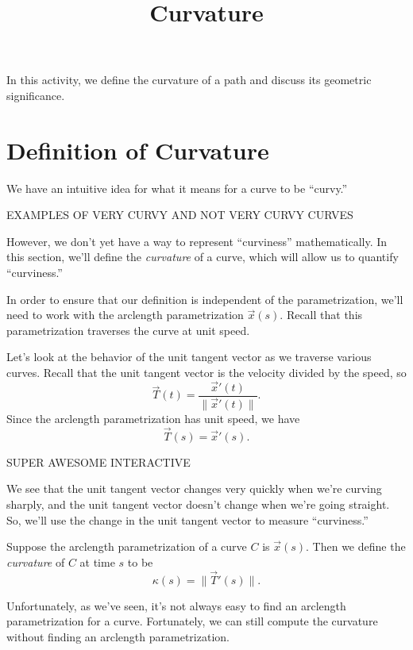 \documentclass{ximera}
\title{Curvature}
\begin{document}
\begin{abstract}
\end{abstract}
\maketitle

In this activity, we define the curvature of a path and discuss its geometric significance.

\section*{Definition of Curvature}

We have an intuitive idea for what it means for a curve to be ``curvy.''

EXAMPLES OF VERY CURVY AND NOT VERY CURVY CURVES

However, we don't yet have a way to represent ``curviness'' mathematically. In this section, we'll define the \emph{curvature} of a curve, which will allow us to quantify ``curviness.''

In order to ensure that our definition is independent of the parametrization, we'll need to work with the arclength parametrization $\vec{x}(s)$. Recall that this parametrization traverses the curve at unit speed.

Let's look at the behavior of the unit tangent vector as we traverse various curves. Recall that the unit tangent vector is the velocity divided by the speed, so
\[
\vec{T}(t) = \frac{\vec{x}'(t)}{\|\vec{x}'(t)\|}.
\]
Since the arclength parametrization has unit speed, we have
\[
\vec{T}(s) = \vec{x}'(s).
\]

SUPER AWESOME INTERACTIVE

We see that the unit tangent vector changes very quickly when we're curving sharply, and the unit tangent vector doesn't change when we're going straight. So, we'll use the change in the unit tangent vector to measure ``curviness.''

\begin{definition}
Suppose the arclength parametrization of a curve $C$ is $\vec{x}(s)$. Then we define the \emph{curvature} of $C$ at time $s$ to be
\[
\kappa(s) = \|\vec{T}'(s)\|.
\]
\end{definition}

Unfortunately, as we've seen, it's not always easy to find an arclength parametrization for a curve. Fortunately, we can still compute the curvature without finding an arclength parametrization.
\end{document}
